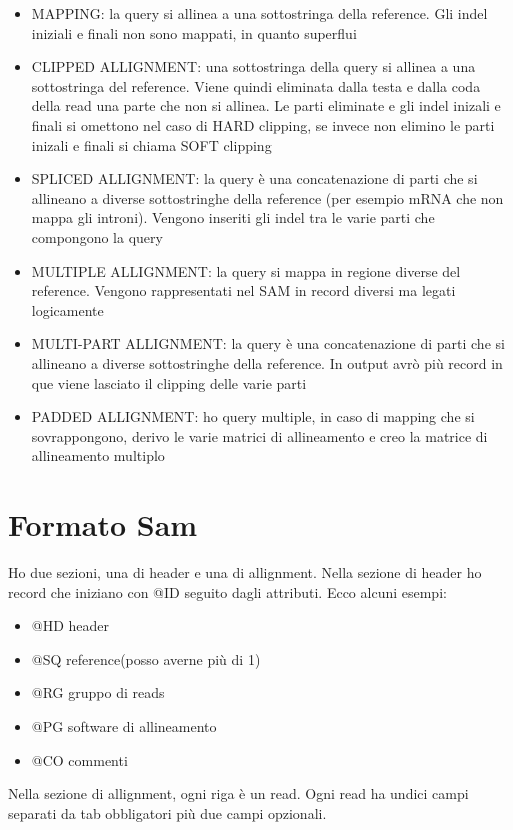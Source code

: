 \begin{itemize}
\item MAPPING: la query si allinea a una sottostringa della reference. Gli indel iniziali e finali non sono mappati, in quanto superflui
\item CLIPPED ALLIGNMENT: una sottostringa della query si allinea a una sottostringa del reference. Viene quindi eliminata dalla testa e dalla coda della read una parte che non si allinea. Le parti eliminate e gli indel inizali e finali si omettono nel caso di HARD clipping, se invece non elimino le parti inizali e finali si chiama SOFT clipping
\item SPLICED ALLIGNMENT: la query è una concatenazione di parti che si allineano a diverse sottostringhe della reference (per esempio mRNA che non mappa gli introni). Vengono inseriti gli indel tra le varie parti che compongono la query
\item MULTIPLE ALLIGNMENT: la query si mappa in regione diverse del reference. Vengono rappresentati nel SAM in record diversi ma legati logicamente
\item MULTI-PART ALLIGNMENT: la query è una concatenazione di parti che si allineano a diverse sottostringhe della reference. In output avrò più record in que viene lasciato il clipping delle varie parti
\item PADDED ALLIGNMENT: ho query multiple, in caso di mapping che si sovrappongono, derivo le varie matrici di allineamento e creo la matrice di allineamento multiplo
\end{itemize}

\section{Formato Sam}
Ho due sezioni, una di header e una di  allignment. Nella sezione di header ho record che iniziano con @ID seguito dagli attributi. Ecco alcuni esempi:

\begin{itemize}
\item @HD	header 
\item @SQ	reference(posso averne più di 1)
\item @RG gruppo di reads
\item @PG software di allineamento
\item @CO commenti
\end{itemize}

Nella sezione di allignment, ogni riga è un read. Ogni read ha undici campi separati da tab obbligatori più due campi opzionali.

